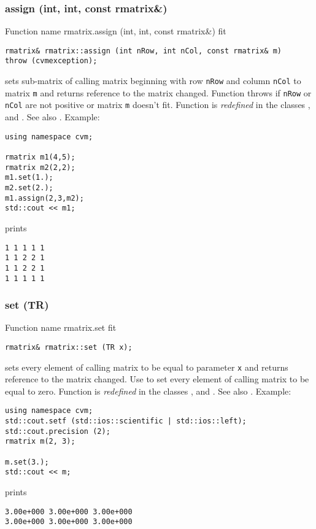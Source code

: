 \subsubsection{assign (int, int, const rmatrix\&)}
Function%
\pdfdest name {rmatrix.assign (int, int, const rmatrix&)} fit
\begin{verbatim}
rmatrix& rmatrix::assign (int nRow, int nCol, const rmatrix& m)
throw (cvmexception);
\end{verbatim}
sets sub-matrix of  calling matrix beginning with \Based row
\verb"nRow" and column \verb"nCol" to  matrix \verb"m" and
returns  reference to the matrix changed. Function throws 
  if \verb"nRow"
or \verb"nCol" are not positive or matrix \verb"m" doesn't fit.
Function is \emph{redefined} in the classes
, 
and .
See also .
Example:
\begin{Verbatim}
using namespace cvm;

rmatrix m1(4,5);
rmatrix m2(2,2);
m1.set(1.);
m2.set(2.);
m1.assign(2,3,m2);
std::cout << m1;
\end{Verbatim}
prints
\begin{Verbatim}
1 1 1 1 1
1 1 2 2 1
1 1 2 2 1
1 1 1 1 1
\end{Verbatim}
\newpage




\subsubsection{set (TR)}
Function%
\pdfdest name {rmatrix.set} fit
\begin{verbatim}
rmatrix& rmatrix::set (TR x);
\end{verbatim}
sets every element of  calling matrix to be equal to
parameter \verb"x" and returns  reference to
the matrix changed.
Use  to set every element
of  calling matrix to be equal to zero.
Function is \emph{redefined} in the classes
, 
and .
See also .
Example:
\begin{Verbatim}
using namespace cvm;
std::cout.setf (std::ios::scientific | std::ios::left);
std::cout.precision (2);
rmatrix m(2, 3);

m.set(3.);
std::cout << m;
\end{Verbatim}
prints
\begin{Verbatim}
3.00e+000 3.00e+000 3.00e+000
3.00e+000 3.00e+000 3.00e+000
\end{Verbatim}
\newpage



